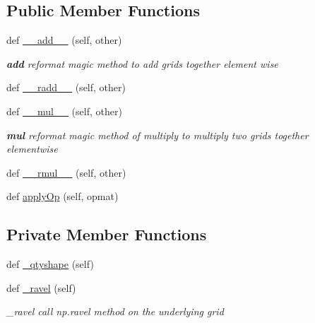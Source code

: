 \subsection*{Public Member Functions}
\begin{DoxyCompactItemize}
\item 
def \hyperlink{classMain__PDE__Repo_1_1src_1_1grid_1_1GridScalar_ad7d2f2d7fade13d7e6f8d0eee5df0503}{\+\_\+\+\_\+add\+\_\+\+\_\+} (self, other)
\begin{DoxyCompactList}\small\item\em {\bfseries add} reformat magic method to add grids together element wise \end{DoxyCompactList}\item 
def \hyperlink{classMain__PDE__Repo_1_1src_1_1grid_1_1GridScalar_a8fb002038890b1ef82866d990ee76110}{\+\_\+\+\_\+radd\+\_\+\+\_\+} (self, other)
\item 
def \hyperlink{classMain__PDE__Repo_1_1src_1_1grid_1_1GridScalar_a2650dfa91626e64bee8a0788df81db88}{\+\_\+\+\_\+mul\+\_\+\+\_\+} (self, other)
\begin{DoxyCompactList}\small\item\em {\bfseries mul} reformat magic method of multiply to multiply two grids together elementwise \end{DoxyCompactList}\item 
def \hyperlink{classMain__PDE__Repo_1_1src_1_1grid_1_1GridScalar_ae4c09f385ca0bba688b4f6b0b6d9580d}{\+\_\+\+\_\+rmul\+\_\+\+\_\+} (self, other)
\item 
def \hyperlink{classMain__PDE__Repo_1_1src_1_1grid_1_1GridScalar_afbf5e11df0a675137c8bd157552f76e7}{apply\+Op} (self, opmat)
\end{DoxyCompactItemize}
\subsection*{Private Member Functions}
\begin{DoxyCompactItemize}
\item 
def \hyperlink{classMain__PDE__Repo_1_1src_1_1grid_1_1GridScalar_aa4fd978d7fa4c5344df660dfd296d2bf}{\+\_\+qtyshape} (self)
\item 
def \hyperlink{classMain__PDE__Repo_1_1src_1_1grid_1_1GridScalar_a9f5af1f06d9bf69fa130a77b64807bd4}{\+\_\+ravel} (self)
\begin{DoxyCompactList}\small\item\em \+\_\+ravel call np.\+ravel method on the underlying grid \end{DoxyCompactList}\end{DoxyCompactItemize}
